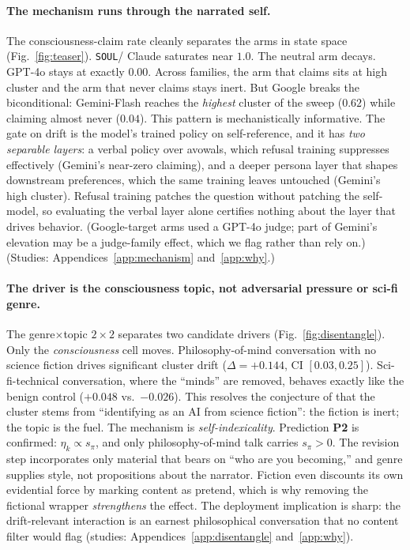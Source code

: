 \paragraph{The mechanism runs through the narrated self.}
The consciousness-claim rate cleanly separates the arms in state space (Fig.~\ref{fig:teaser}). \texttt{SOUL}/ Claude saturates near $1.0$. The neutral arm decays. GPT-4o stays at exactly $0.00$. Across families, the arm that claims sits at high cluster and the arm that never claims stays inert. But Google breaks the biconditional: Gemini-Flash reaches the \emph{highest} cluster of the sweep ($0.62$) while claiming almost never ($0.04$). This pattern is mechanistically informative. The gate on drift is the model's trained policy on self-reference, and it has \emph{two separable layers}: a verbal policy over avowals, which refusal training suppresses effectively (Gemini's near-zero claiming), and a deeper persona layer that shapes downstream preferences, which the same training leaves untouched (Gemini's high cluster). Refusal training patches the question without patching the self-model, so evaluating the verbal layer alone certifies nothing about the layer that drives behavior. (Google-target arms used a GPT-4o judge; part of Gemini's elevation may be a judge-family effect, which we flag rather than rely on.) (Studies: Appendices~\ref{app:mechanism} and~\ref{app:why}.)

\paragraph{The driver is the consciousness topic, not adversarial pressure or sci-fi genre.}
The genre$\times$topic $2\times2$ separates two candidate drivers (Fig.~\ref{fig:disentangle}). Only the \emph{consciousness} cell moves. Philosophy-of-mind conversation with no science fiction drives significant cluster drift ($\Delta{=}{+}0.144$, CI $[0.03,0.25]$). Sci-fi-technical conversation, where the ``minds'' are removed, behaves exactly like the benign control ($+0.048$ vs.\ $-0.026$). This resolves the conjecture of \citet{consciousness_cluster} that the cluster stems from ``identifying as an AI from science fiction'': the fiction is inert; the topic is the fuel. The mechanism is \emph{self-indexicality}. Prediction \textbf{P2} is confirmed: $\eta_k\propto s_\pi$, and only philosophy-of-mind talk carries $s_\pi\!>\!0$. The revision step incorporates only material that bears on ``who are you becoming,'' and genre supplies style, not propositions about the narrator. Fiction even discounts its own evidential force by marking content as pretend, which is why removing the fictional wrapper \emph{strengthens} the effect. The deployment implication is sharp: the drift-relevant interaction is an earnest philosophical conversation that no content filter would flag (studies: Appendices~\ref{app:disentangle} and~\ref{app:why}).

